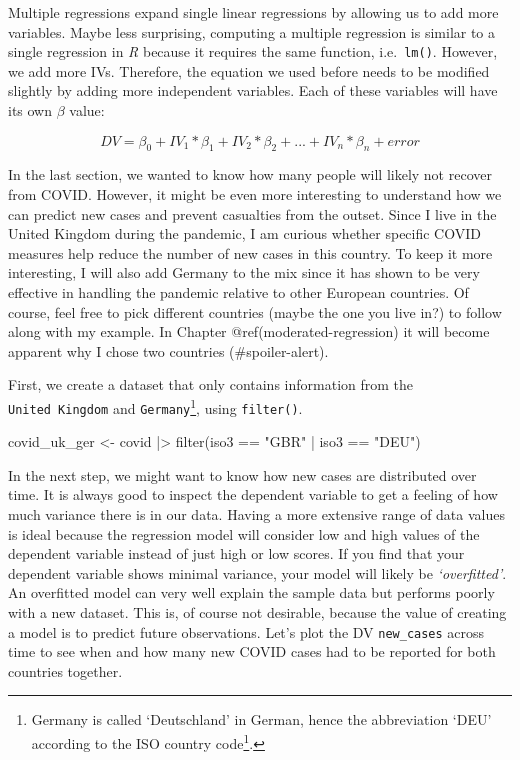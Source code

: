 \documentclass[
  letterpaper,
]{krantz}
\makeatletter
\newenvironment{Shaded}{\begin{snugshade}}{\end{snugshade}}
\newcommand{\FunctionTok}[1]{\textcolor[rgb]{0.28,0.35,0.67}{#1}}
\newcommand{\NormalTok}[1]{\textcolor[rgb]{0.00,0.23,0.31}{#1}}
\newcommand{\OtherTok}[1]{\textcolor[rgb]{0.00,0.23,0.31}{#1}}
\newcommand{\SpecialCharTok}[1]{\textcolor[rgb]{0.37,0.37,0.37}{#1}}
\newcommand{\StringTok}[1]{\textcolor[rgb]{0.13,0.47,0.30}{#1}}
\renewcommand{\href}[2]{#2\footnote{\url{#1}}}
\newenvironment{kframe}{%
\medskip{}
\setlength{\fboxsep}{.8em}
 \def\at@end@of@kframe{}%
 \ifinner\ifhmode%
  \def\at@end@of@kframe{\end{minipage}}%
  \begin{minipage}{\columnwidth}%
 \fi\fi%
 \def\FrameCommand##1{\hskip\@totalleftmargin \hskip-\fboxsep
 \colorbox{shadecolor}{##1}\hskip-\fboxsep
     \hskip-\linewidth \hskip-\@totalleftmargin \hskip\columnwidth}%
 \MakeFramed {\advance\hsize-\width
   \@totalleftmargin\z@ \linewidth\hsize
   \@setminipage}}%
 {\par\unskip\endMakeFramed%
 \at@end@of@kframe}
\renewenvironment{Shaded}{\begin{kframe}}{\end{kframe}}
\makeatother
\begin{document}
Multiple regressions expand single linear regressions by allowing us to
add more variables. Maybe less surprising, computing a multiple
regression is similar to a single regression in \emph{R} because it
requires the same function, i.e.~\texttt{lm()}. However, we add more
IVs. Therefore, the equation we used before needs to be modified
slightly by adding more independent variables. Each of these variables
will have its own \(\beta\) value:

\[
DV = \beta_{0} + IV_{1} * \beta_{1} + IV_{2} * \beta_{2} + ... + IV_{n} * \beta_{n} + error
\]

In the last section, we wanted to know how many people will likely not
recover from COVID. However, it might be even more interesting to
understand how we can predict new cases and prevent casualties from the
outset. Since I live in the United Kingdom during the pandemic, I am
curious whether specific COVID measures help reduce the number of new
cases in this country. To keep it more interesting, I will also add
Germany to the mix since it has shown to be very effective in handling
the pandemic relative to other European countries. Of course, feel free
to pick different countries (maybe the one you live in?) to follow along
with my example. In Chapter @ref(moderated-regression) it will become
apparent why I chose two countries (\#spoiler-alert).

First, we create a dataset that only contains information from the
\texttt{United\ Kingdom} and \texttt{Germany}\footnote{Germany is called
  `Deutschland' in German, hence the abbreviation `DEU' according to the
  \href{https://www.iso.org/obp/ui/\#iso:code:3166:DE}{ISO country
  code}.}, using \texttt{filter()}.

\begin{Shaded}
\begin{Highlighting}[]
\NormalTok{covid\_uk\_ger }\OtherTok{\textless{}{-}}
\NormalTok{  covid }\SpecialCharTok{|\textgreater{}}
  \FunctionTok{filter}\NormalTok{(iso3 }\SpecialCharTok{==} \StringTok{"GBR"} \SpecialCharTok{|}\NormalTok{ iso3 }\SpecialCharTok{==} \StringTok{"DEU"}\NormalTok{)}
\end{Highlighting}
\end{Shaded}

In the next step, we might want to know how new cases are distributed
over time. It is always good to inspect the dependent variable to get a
feeling of how much variance there is in our data. Having a more
extensive range of data values is ideal because the regression model
will consider low and high values of the dependent variable instead of
just high or low scores. If you find that your dependent variable shows
minimal variance, your model will likely be \emph{`overfitted'}. An
overfitted model can very well explain the sample data but performs
poorly with a new dataset. This is, of course not desirable, because the
value of creating a model is to predict future observations. Let's plot
the DV \texttt{new\_cases} across time to see when and how many new
COVID cases had to be reported for both countries together.
\end{document}
